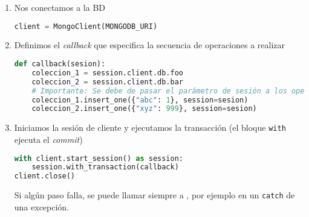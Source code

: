 \begin{enumerate}[label=\arabic*)]
	\item Nos conectamos a la BD
\begin{lstlisting}[language=python]
client = MongoClient(MONGODB_URI)
\end{lstlisting}
\item Definimos el \textit{callback} que especifica la secuencia de operaciones a realizar
\begin{lstlisting}[language=python]
def callback(sesion):
	coleccion_1 = session.client.db.foo
	coleccion_2 = session.client.db.bar
	# Importante: Se debe de pasar el parámetro de sesión a los operadores.
	coleccion_1.insert_one({"abc": 1}, session=sesion)
	coleccion_2.insert_one({"xyz": 999}, session=sesion)
\end{lstlisting}
\item Iniciamos la sesión de cliente y ejecutamos la transacción (el bloque \texttt{with} ejecuta el \textit{commit})
\begin{lstlisting}[language=python]
with client.start_session() as session:
	session.with_transaction(callback)
client.close()
\end{lstlisting}
Si algún paso falla, se puede llamar siempre a , por ejemplo en un \texttt{catch} de una excepción.
\end{enumerate}